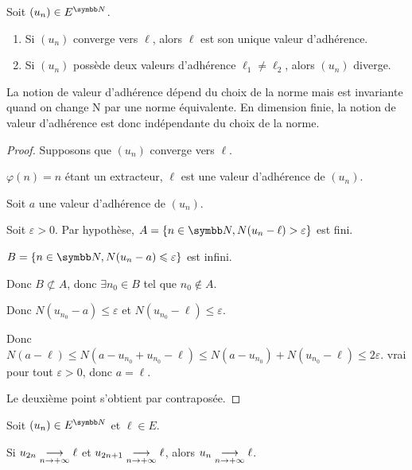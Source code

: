 \begin{proposition}{}{}
    Soit $(u_n) \in E^{\N}$. 

    \begin{enumerate}
        \item Si $(u_n)$ converge vers $\ell$, alors $\ell$ est son unique valeur d'adhérence. 
        \item Si $(u_n)$ possède deux valeurs d'adhérence $\ell_1 \neq \ell_2$, alors $(u_n)$ diverge.
    \end{enumerate}
\end{proposition}

\begin{remarque}
    La notion de valeur d'adhérence dépend du choix de la norme mais est invariante 
    quand on change N par une norme équivalente. En dimension finie, la notion de valeur d'adhérence
    est donc indépendante du choix de la norme. 
\end{remarque}

\begin{proof}
    Supposons que $(u_n)$ converge vers $\ell$.

    $\varphi(n) =n$ étant un extracteur, $\ell$ est une valeur d'adhérence de $(u_n)$.

    \svspace Soit $a$ une valeur d'adhérence de $(u_n)$.
    
    Soit $\varepsilon > 0$. Par hypothèse, $A = \{n \in \N, N(u_n - \ell) > \varepsilon\}$ est 
    fini. 

    $B = \{n \in \N, N(u_n - a) \leqslant \varepsilon \}$ est infini. 

    Donc $B \not\subset A$, donc $\exists n_0 \in B$ tel que $n_0 \not\in A$.

    Donc $N(u_{n_0} - a) \leqslant \varepsilon$ et $N(u_{n_0} - \ell) \leqslant \varepsilon$.

    Donc $N(a - \ell) \leqslant N(a - u_{n_0} + u_{n_0} - \ell) \leqslant N(a - u_{n_0}) + N(u_{n_0} - \ell) \leqslant 2\varepsilon$.
    vrai pour tout $\varepsilon > 0$, donc $a = \ell$.

    Le deuxième point s'obtient par contraposée.
\end{proof}

\begin{proposition}{}{}
    Soit $(u_n) \in E^{\N}$ et $\ell \in E$.

    Si $u_{2n} \underset{n \to +\infty}{\longrightarrow} \ell$ et $u_{2n + 1} \underset{n \to +\infty}{\longrightarrow} \ell$, alors
    $u_n \underset{n \to +\infty}{\longrightarrow} \ell$.
\end{proposition}

